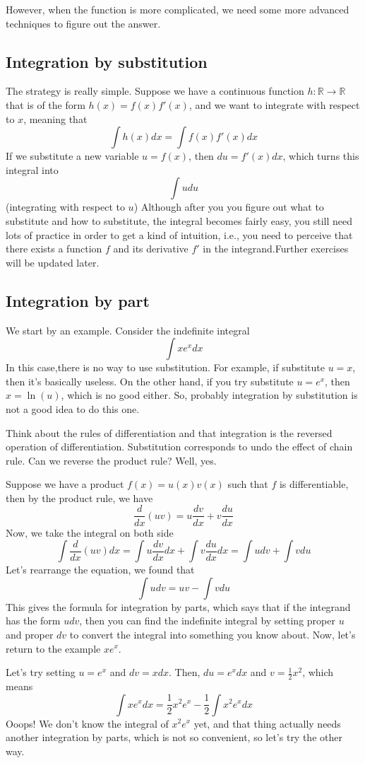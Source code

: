 \documentclass{article}
\theoremstyle{definition}
\theoremstyle{definition}
\theoremstyle{definition}
\theoremstyle{definition}
\theoremstyle{definition}
\theoremstyle{definition}
\theoremstyle{definition}
\theoremstyle{definition}
\theoremstyle{definition}
\begin{document}
However, when the function is more complicated, we need some more advanced techniques to figure out the answer.

\subsection{Integration by substitution}
The strategy is really simple. Suppose we have a continuous function $h:\mathbb{R}\to\mathbb{R}$ that is of the form $h(x)=f(x)f'(x)$, and we want to integrate with respect to $x$, meaning that
\[
\int h(x)dx=\int f(x)f'(x)dx
\]
If we substitute a new variable $u=f(x)$, then $du=f'(x)dx$, which turns this integral into
\[
\int udu
\]
(integrating with respect to $u$) Although after you you figure out what to substitute and how to substitute, the integral becomes fairly easy, you still need lots of practice in order to get a kind of intuition, i.e., you need to perceive that there exists a function $f$ and its derivative $f'$ in the integrand.Further exercises will be updated later.
\subsection{Integration by part}
We start by an example. Consider the indefinite integral
\[
\int xe^xdx
\]
In this case,there is no way to use substitution. For example, if substitute $u=x$, then it's basically useless. On the other hand, if you try substitute $u=e^x$, then $x=\ln(u)$, which is no good either. So, probably integration by substitution is not a good idea to do this one.

Think about the rules of differentiation and that integration is the reversed operation of differentiation. Substitution corresponds to undo the effect of chain rule. Can we reverse the product rule? Well, yes.

Suppose we have a product $f(x)=u(x)v(x)$ such that $f$ is differentiable, then by the product rule, we have 
\[\dfrac{d}{dx}(uv)=u\dfrac{dv}{dx}+v\dfrac{du}{dx}\]
Now, we take the integral on both side
\[
\int \dfrac{d}{dx}(uv)dx=\int u\dfrac{dv}{dx}dx+\int v\dfrac{du}{dx}dx=\int udv+\int vdu
\]
Let's rearrange the equation, we found that 
\[
\int udv=uv-\int vdu
\]
This gives the formula for integration by parts, which says that if the integrand has the form $udv$, then you can find the indefinite integral by setting proper $u$ and proper $dv$ to convert the integral into something you know about. Now, let's return to the example $xe^x$.

Let's try setting $u=e^x$ and $dv=xdx$. Then, $du=e^xdx$ and $v=\frac{1}{2}x^2$, which means
\[
\int xe^xdx=\dfrac{1}{2}x^2e^x-\dfrac{1}{2}\int x^2e^xdx
\]
Ooops! We don't know the integral of $x^2e^x$ yet, and that thing actually needs another integration by parts, which is not so convenient, so let's try the other way.
\end{document}
